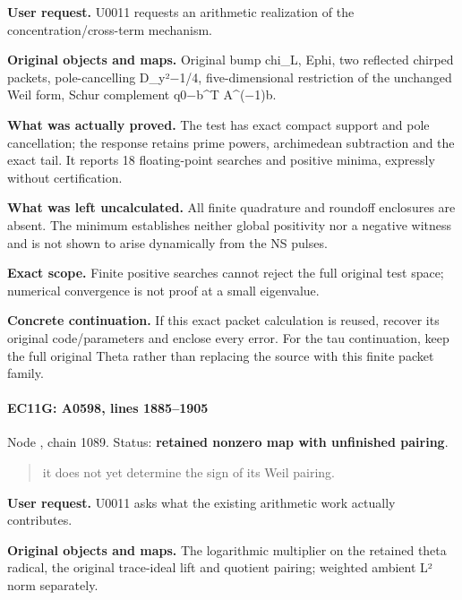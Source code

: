 \textbf{User request.} U0011 requests an arithmetic realization of the
concentration/cross-term mechanism.

\textbf{Original objects and maps.} Original bump chi\_L, Ephi, two
reflected chirped packets, pole-cancelling
D\_y²\allowbreak{}\ensuremath{−}\allowbreak{}1/4, five-dimensional
restriction of the unchanged Weil form, Schur complement
q0\allowbreak{}\ensuremath{−}\allowbreak{}b\textasciicircum{}T
A\textasciicircum{}(\allowbreak{}\ensuremath{−}\allowbreak{}1)b.

\textbf{What was actually proved.} The test has exact compact support
and pole cancellation; the response retains prime powers, archimedean
subtraction and the exact tail. It reports 18 floating-point searches
and positive minima, expressly without certification.

\textbf{What was left uncalculated.} All finite quadrature and roundoff
enclosures are absent. The minimum establishes neither global positivity
nor a negative witness and is not shown to arise dynamically from the NS
pulses.

\textbf{Exact scope.} Finite positive searches cannot reject the full
original test space; numerical convergence is not proof at a small
eigenvalue.

\textbf{Concrete continuation.} If this exact packet calculation is
reused, recover its original code/parameters and enclose every error.
For the tau continuation, keep the full original Theta rather than
replacing the source with this finite packet family.

\paragraph{EC11G: A0598, lines
1885--1905}\label{ec11g-a0598-lines-18851905}

Node \protect{}, chain 1089.
Status: \textbf{retained nonzero map with unfinished pairing}.

\begin{quote}
it does not yet determine the sign of its Weil pairing.
\end{quote}

\textbf{User request.} U0011 asks what the existing arithmetic work
actually contributes.

\textbf{Original objects and maps.} The logarithmic multiplier on the
retained theta radical, the original trace-ideal lift and quotient
pairing; weighted ambient L² norm separately.

